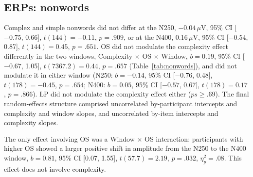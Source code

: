 \subsection{ERPs: nonwords}
Complex and simple nonwords did not differ at the N250, $-0.04$\,$\mu$V, 95\% CI
[$-0.75$, 0.66], $t(144) = -0.11$, $p = .909$, or at the N400, 0.16\,$\mu$V, 95\%
CI [$-0.54$, 0.87], $t(144) = 0.45$, $p = .651$. OS did not modulate the
complexity effect differently in the two windows, Complexity $\times$ OS $\times$
Window, $b = 0.19$, 95\% CI [$-0.67$, 1.05], $t(7367.2) = 0.44$, $p = .657$
(Table~\ref{tab:nonwords}), and did not modulate it in either window (N250:
$b = -0.14$, 95\% CI [$-0.76$, 0.48], $t(178) = -0.45$, $p = .654$; N400:
$b = 0.05$, 95\% CI [$-0.57$, 0.67], $t(178) = 0.17$, $p = .866$). LP did not
modulate the complexity effect either ($ps \geq .69$). The final random-effects
structure comprised uncorrelated by-participant intercepts and complexity and
window slopes, and uncorrelated by-item intercepts and complexity slopes.

The only effect involving OS was a Window $\times$ OS interaction: participants
with higher OS showed a larger positive shift in amplitude from the N250 to the
N400 window, $b = 0.81$, 95\% CI [0.07, 1.55], $t(57.7) = 2.19$, $p = .032$,
$\eta^2_p = .08$. This effect does not involve complexity.

